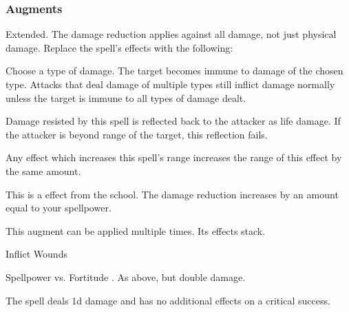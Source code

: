 \subsubsection{Augments}
 Extended.
The damage reduction applies against all damage, not just physical damage.
Replace
the spell's effects with the following:
\begin{augmenteffects}
\spelleffect
Choose a type of damage.
The target becomes immune to damage of the chosen type.
Attacks that deal damage of multiple types still inflict damage normally unless the target is immune to all types of damage dealt.
\end{augmenteffects}
Damage resisted by this spell is reflected back to the attacker as life damage.
If the attacker is beyond \rngclose range of the target, this reflection fails.
\par Any effect which increases this spell's range increases the range of this effect by the same amount.
\par
This is a  effect from the  school.
The damage reduction increases by an amount equal to your spellpower.
\par
This augment can be applied multiple times.
Its effects stack.
\begin{spellsection}{Inflict Wounds}
\begin{spellcontent}
\begin{spelltargetinginfo}
\end{spelltargetinginfo}
\begin{spelleffects}
\begin{spellattack}{Spellpower vs. Fortitude}
\spellsuccess {}.
\spellcritical As above, but double damage.
\end{spellattack}
\end{spelleffects}
\end{spellcontent}
\begin{spellfooter}
\miscastexplode
\end{spellfooter}
\begin{spellcantrip}
The spell deals \minus1d damage and has no additional effects on a critical success.
\end{spellcantrip}
\end{spellsection}
